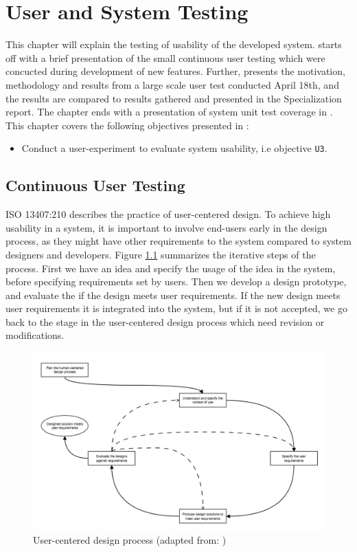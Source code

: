 \chapter{User and System Testing}
\label{ch:testing}
This chapter will explain the testing of usability of the developed system.  starts off with a brief presentation of the small continuous user testing which were concucted during development of new features. Further,  presents the motivation, methodology and results from a large scale user test conducted April 18th, and the results are compared to results gathered and presented in the Specialization report. The chapter ends with a presentation of system unit test coverage in . This chapter covers the following objectives presented in :
\begin{itemize}
  \item Conduct a user-experiment to evaluate system usability, i.e objective \texttt{U3}.
\end{itemize}

\section{Continuous User Testing}
\label{sec:cont-user-testing}
ISO 13407:210 \cite{iso1999HCD} describes the practice of user-centered design. To achieve high usability in a system, it is important to involve end-users early in the design process, as they might have other requirements to the system compared to system designers and developers. Figure \ref{fig:user-centered-design} summarizes the iterative steps of the process. First we have an idea and specify the usage of the idea in the system, before specifying requirements set by users. Then we develop a design prototype, and evaluate the if the design meets user requirements. If the new design meets user requirements it is integrated into the system, but if it is not accepted, we go back to the stage in the user-centered design process which need revision or modifications. \\

\begin{figure}
  \includegraphics[width=1.0\textwidth]{figs/iterative-design-process.png}
  \caption[User-centered design process]{User-centered design process (adapted from: \cite{iso1999HCD})}
  \label{fig:user-centered-design}
\end{figure}

